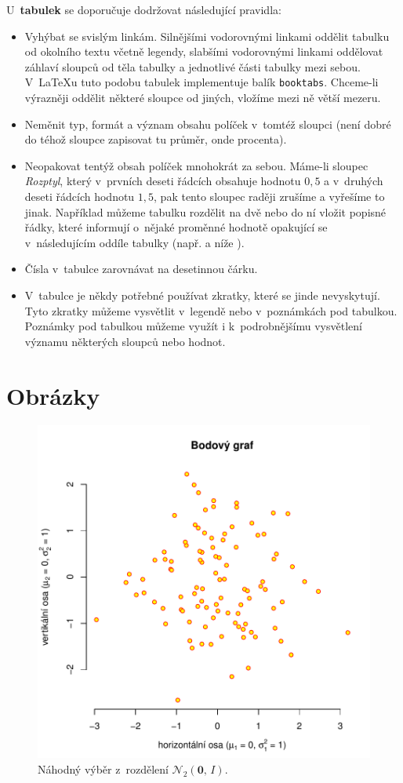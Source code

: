 U~\textbf{tabulek} se doporučuje dodržovat následující pravidla:

\begin{itemize} %
\item Vyhýbat se svislým linkám. Silnějšími vodorovnými linkami
  oddělit tabulku od okolního textu včetně legendy, slabšími
  vodorovnými linkami oddělovat záhlaví sloupců od těla tabulky a
  jednotlivé části tabulky mezi sebou. V~\LaTeX u tuto podobu tabulek
  implementuje balík \texttt{booktabs}. Chceme-li výrazněji oddělit
  některé sloupce od jiných, vložíme mezi ně větší mezeru.
\item Neměnit typ, formát a význam obsahu políček v~tomtéž sloupci
  (není dobré do téhož sloupce zapisovat tu průměr, onde procenta).
\item Neopakovat tentýž obsah políček mnohokrát za sebou. Máme-li
  sloupec \textit{Rozptyl}, který v~prvních deseti řádcích obsahuje
  hodnotu $0,5$ a v~druhých deseti řádcích hodnotu $1,5$, pak tento
  sloupec raději zrušíme a vyřešíme to jinak. Například můžeme tabulku
  rozdělit na dvě nebo do ní vložit popisné řádky, které informují
o~nějaké proměnné hodnotě opakující se v~následujícím oddíle tabulky
  (např. \emph{} a níže \emph{}).
\item Čísla v~tabulce zarovnávat na desetinnou čárku.
\item V~tabulce je někdy potřebné používat zkratky, které se jinde
nevyskytují. Tyto zkratky můžeme vysvětlit v~legendě nebo
v~poznámkách pod tabulkou. Poznámky pod tabulkou můžeme využít i
k~podrobnějšímu vysvětlení významu  některých sloupců nebo hodnot.
\end{itemize}


\section{Obrázky}

\begin{figure}[htbp!]\centering
\includegraphics[width=.66\textwidth]{img/ukazka-obr01}
\caption{Náhodný výběr z~rozdělení $\mathcal{N}_2(\boldsymbol{0},\,I)$.}
\label{obr03:Nvyber}
\end{figure}


